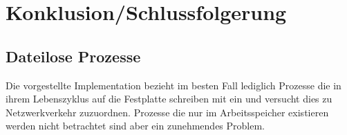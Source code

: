 \chapter{Konklusion/Schlussfolgerung}%
\label{cha:conclusion}


\section{Dateilose Prozesse}
Die vorgestellte Implementation bezieht im besten Fall lediglich Prozesse die in ihrem Lebenszyklus auf die Festplatte schreiben mit ein und versucht dies zu Netzwerkverkehr zuzuordnen. Prozesse die nur im Arbeitsspeicher existieren werden nicht betrachtet sind aber ein zunehmendes Problem.

